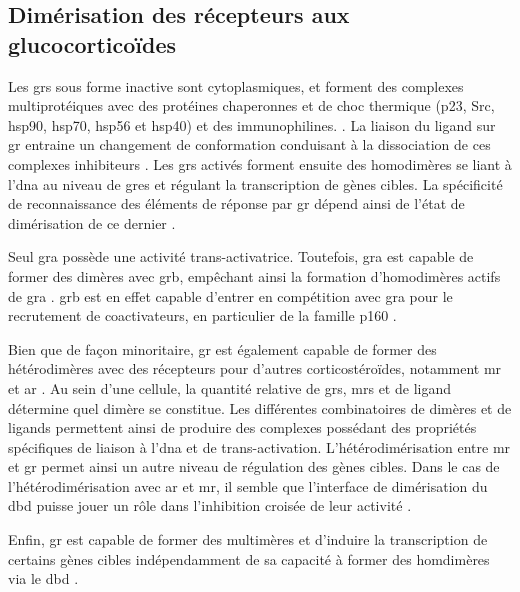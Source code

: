 \documentclass[../main.tex]{subfiles}
\begin{document}
\subsection{Dimérisation des récepteurs aux glucocorticoïdes}\label{subsubsec:gr-dimerisation}
Les \glspl{gr} sous forme inactive sont cytoplasmiques, et forment des complexes multiprotéiques avec des protéines chaperonnes et de choc thermique (p23, Src, \gls{hsp90}, \gls{hsp70}, \gls{hsp56} et \gls{hsp40}) et des immunophilines. \citep{Baulieu1987,Pratt2006}.
La liaison du ligand sur \gls{gr} entraine un changement de conformation conduisant à la dissociation de ces complexes inhibiteurs \citep{Groyer1987}.
Les \glspl{gr} activés forment ensuite des homodimères \citep{Wrange1989} se liant à l'\gls{dna} au niveau de \glspl{gre} et régulant la transcription de gènes cibles.
La spécificité de reconnaissance des éléments de réponse par \gls{gr} dépend ainsi de l'état de dimérisation de ce dernier \citep{Eriksson1990}.
\par
Seul \gls{gra} possède une activité trans-activatrice.
Toutefois, \gls{gra} est capable de former des dimères avec \gls{grb}, empêchant ainsi la formation d'homodimères actifs de \gls{gra} \citep{Oakley1999}.
\gls{grb} est en effet capable d'entrer en compétition avec \gls{gra} pour le recrutement de coactivateurs, en particulier de la famille p160 \citep{Yudt2003,Charmandari2005}.
\par
Bien que de façon minoritaire, \gls{gr} est également capable de former des hétérodimères avec des récepteurs pour d'autres corticostéroïdes, notamment \gls{mr} \citep{Trapp1994,Savory2001} et \gls{ar} \citep{Chen1997}.
Au sein d'une cellule, la quantité relative de \glspl{gr}, \glspl{mr} et de ligand détermine quel dimère se constitue.
Les différentes combinatoires de dimères et de ligands permettent ainsi de produire des complexes possédant des propriétés spécifiques de liaison à l'\gls{dna} et de trans-activation.
L'hétérodimérisation entre \gls{mr} et \gls{gr} permet ainsi un autre niveau de régulation des gènes cibles.
Dans le cas de l'hétérodimérisation avec \gls{ar} et \gls{mr}, il semble que l'interface de dimérisation du \gls{dbd} puisse jouer un rôle dans l'inhibition croisée de leur activité \citep{Chen1997,Liu1997}.
\par
Enfin, \gls{gr} est capable de former des multimères et d'induire la transcription de certains gènes cibles indépendamment de sa capacité à former des homdimères via le \gls{dbd} \citep{Adams2003}.

\end{document}
